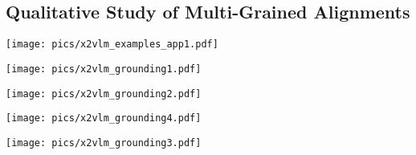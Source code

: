 \documentclass{article}
\newcommand{\baby}{X-VLM\xspace}
\begin{document}
\subsection{Qualitative Study of Multi-Grained Alignments}

\begin{figure*}[ht]
\begin{center}
\centerline{\texttt{[image: pics/x2vlm\_examples\_app1.pdf]}}
\caption{Visualization of \baby generating captions for images and locating visual concepts given manual input descriptions. }
\label{app:example1}
\end{center}
\end{figure*}


\begin{figure*}[ht]
\begin{center}
\centerline{\texttt{[image: pics/x2vlm\_grounding1.pdf]}}
\caption{Visualization of \baby locating visual concepts in robot grasping scene given text descriptions: 1) ``deep blue cup''; 2) ``light blue cup''; 3) ``blue cup at the bottom''; 4) ``four cups at the top''; 5) ``two small ducks''. }
\label{app:g1}
\end{center}
\end{figure*}

\begin{figure*}[ht]
\begin{center}
\centerline{\texttt{[image: pics/x2vlm\_grounding2.pdf]}}
\caption{Visualization of \baby locating celebrities and cartoon characters given text descriptions: 1) ``Albert Einstein''; 2)``Edison''; 3)``Ultraman''; 4)``Doraemon''. }
\label{app:g2}
\end{center}
\end{figure*}

\begin{figure*}[ht]
\begin{center}
\centerline{\texttt{[image: pics/x2vlm\_grounding4.pdf]}}
\caption{Visualization of \baby locating objects in an image from an e-commerce website in China. The input text descriptions are: 1) ``shoes''; 2)``vacuum cleaner''; 3)``lipstick''; 4)``dress''. }
\label{app:g3}
\end{center}
\end{figure*}


\begin{figure*}[ht]
\begin{center}
\centerline{\texttt{[image: pics/x2vlm\_grounding3.pdf]}}
\caption{Visualization of \baby locating visual concepts in an image from children's textbooks. The input text descriptions are: 1) ``flying kites in the park''; 2) ``watering flowers''; 3) ``well dressed girl''; 4) ``Tiananmen Tower''; 5) ``drive to work''; 6) ``sign''; 7) ``traffic lights''. }
\label{app:g4}
\end{center}
\end{figure*}
\end{document}
